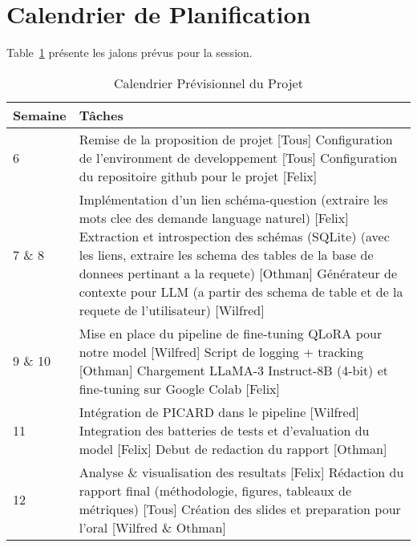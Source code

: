 \documentclass[12pt]{article}
\begin{document}
\section{Calendrier de Planification}
Table~\ref{tab:plan} présente les jalons prévus pour la session.
\begin{table}[h!]
  \caption{Calendrier Prévisionnel du Projet}
  \label{tab:plan}
  \centering
  \begin{tabular}{|p{2cm}|p{13cm}|}
    \hline
    \textbf{Semaine} & \textbf{Tâches} \\ \hline
    6 & 
      Remise de la proposition de projet [Tous] 
      \newline
      Configuration de l'environment de developpement [Tous] 
      \newline
      Configuration du repositoire github pour le projet [Felix]
      \\ \hline
    7 \& 8 & 
      Implémentation d’un lien schéma-question (extraire les mots clee des demande language naturel) [Felix]
      \newline
      Extraction et introspection des schémas (SQLite) (avec les liens, extraire les schema des tables de la base de donnees pertinant a la requete) [Othman]
      \newline
      Générateur de contexte pour LLM (a partir des schema de table et de la requete de l'utilisateur) [Wilfred]
      \\ \hline
    9 \& 10 & 
      Mise en place du pipeline de fine-tuning QLoRA pour notre model [Wilfred]
      \newline
      Script de logging + tracking [Othman]
      \newline
      Chargement LLaMA-3 Instruct-8B (4-bit) et fine-tuning sur Google Colab [Felix]
      \\ \hline
    11 & 
      Intégration de PICARD dans le pipeline [Wilfred] \newline
      Integration des batteries de tests et d'evaluation du model [Felix] \newline
      Debut de redaction du rapport [Othman]
      \\ \hline
    12 & 
      Analyse \& visualisation des resultats [Felix] \newline
      Rédaction du rapport final (méthodologie, figures, tableaux de métriques) [Tous] \newline
      Création des slides et preparation pour l’oral [Wilfred \& Othman]
      \\ \hline
  \end{tabular}
\end{table}
\end{document}
